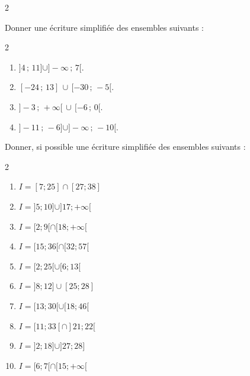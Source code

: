 {\begin{Exercice}
\begin{multicols}{2}
\begin{enumerate}[itemsep=1em]
\end{enumerate}
\end{multicols}
\vspace{-0.5cm}
\end{Exercice}

\begin{Exercice}
Donner une écriture simplifiée des ensembles suivants :
\vspace{-0.5cm}
\begin{multicols}{2}
\begin{enumerate}[itemsep=1em]
	\item $]4\,;\,11]\cup ]-\infty \,; \,7[$.
	\item $[-24\,;\,13]\,\cup \,[ -30\,;\,-5[$.
	\item $] -3\,;\,+\infty[\,\cup \,[-6\,;\,0[$.
	\item $]-11\,;\,-6]\cup ]-\infty \,; \,-10[$.
\end{enumerate}
\end{multicols}
\vspace{-0.5cm}
\end{Exercice}









\begin{Exercice}
Donner, si possible une écriture simplifiée des ensembles suivants :
\begin{multicols}{2}
\begin{enumerate}[itemsep=1em]
	\item $I=[7;25]\cap[27;38]$
	\item $I=]5;10]\cup]17;+\infty[$
	\item $I=[2;9[\cap[18;+\infty[$
	\item $I=[15;36[\cap[32;57[$
	\item $I=[2;25[\cup[6;13[$
	\item $I=]8;12]\cup[25;28]$
	\item $I=[13;30[\cup[18;46[$
	\item $I=[11;33[\cap]21;22[$
	\item $I=]2;18]\cup]27;28]$
	\item $I=[6;7[\cap[15;+\infty[$
\end{enumerate}
\end{multicols}
\end{Exercice}



}
